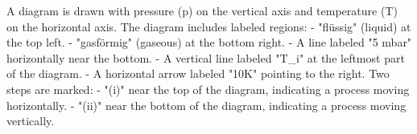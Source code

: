 A diagram is drawn with pressure (p) on the vertical axis and temperature (T) on the horizontal axis. The diagram includes labeled regions:  
- "flüssig" (liquid) at the top left.  
- "gasförmig" (gaseous) at the bottom right.  
- A line labeled "5 mbar" horizontally near the bottom.  
- A vertical line labeled "T_i" at the leftmost part of the diagram.  
- A horizontal arrow labeled "10K" pointing to the right.  
Two steps are marked:  
- "(i)" near the top of the diagram, indicating a process moving horizontally.  
- "(ii)" near the bottom of the diagram, indicating a process moving vertically.